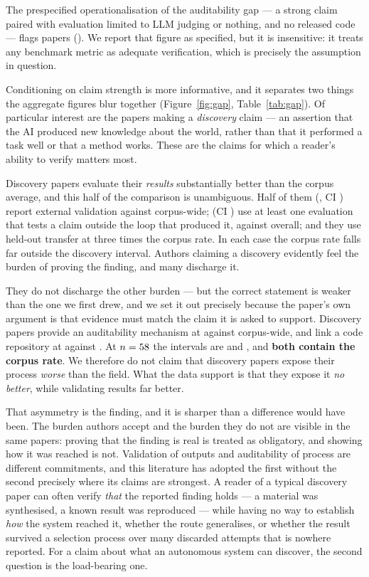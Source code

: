 The prespecified operationalisation of the auditability gap --- a strong claim paired with
evaluation limited to LLM judging or nothing, and no released code --- flags \nWeakStrong{}
papers (\pctWeakStrong{}). We report that figure as specified, but it is insensitive: it
treats any benchmark metric as adequate verification, which is precisely the assumption in
question.

Conditioning on claim strength is more informative, and it separates two things the aggregate
figures blur together (Figure~\ref{fig:gap}, Table~\ref{tab:gap}). Of particular interest are
the \nDiscovery{} papers making a \emph{discovery} claim --- an assertion that the AI produced
new knowledge about the world, rather than that it performed a task well or that a method
works. These are the claims for which a reader's ability to verify matters most.

Discovery papers evaluate their \emph{results} substantially better than the corpus average,
and this half of the comparison is unambiguous. Half of them (\pctDiscRealWorld{}, CI
\ciDiscRealWorld{}) report external validation against \pctRealWorld{} corpus-wide;
\pctDiscStrongEval{} (CI \ciDiscStrongEval{}) use at least one evaluation that tests a claim
outside the loop that produced it, against \pctStrongEval{} overall; and they use held-out
transfer at three times the corpus rate. In each case the corpus rate falls far outside the
discovery interval. Authors claiming a discovery evidently feel the burden of proving the
finding, and many discharge it.

They do not discharge the other burden --- but the correct statement is weaker than the one
we first drew, and we set it out precisely because the paper's own argument is that evidence
must match the claim it is asked to support. Discovery papers provide an auditability
mechanism at \pctDiscAudit{} against \pctAnyAudit{} corpus-wide, and link a code repository at
\pctDiscRepo{} against \pctRepo{}. At $n=58{}$ the intervals are \ciDiscAudit{} and
\ciDiscRepo{}, and \textbf{both contain the corpus rate}. We therefore do not claim that
discovery papers expose their process \emph{worse} than the field. What the data support is
that they expose it \emph{no better}, while validating results far better.

That asymmetry is the finding, and it is sharper than a difference would have been. The
burden authors accept and the burden they do not are visible in the same papers: proving that
the finding is real is treated as obligatory, and showing how it was reached is not. Validation
of outputs and auditability of process are different commitments, and this literature has
adopted the first without the second precisely where its claims are strongest. A reader of a
typical discovery paper can often verify \emph{that} the reported finding holds --- a material
was synthesised, a known result was reproduced --- while having no way to establish \emph{how}
the system reached it, whether the route generalises, or whether the result survived a
selection process over many discarded attempts that is nowhere reported. For a claim about
what an autonomous system can discover, the second question is the load-bearing one.

